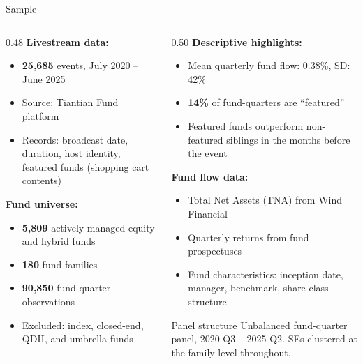 \documentclass[11pt, aspectratio=169]{beamer}
\newcommand{\hl}[1]{\textcolor{myblue}{\textbf{#1}}}
\begin{document}
\begin{frame}{Sample}

\begin{columns}[T]
\begin{column}{0.48\textwidth}
\textbf{Livestream data:}
\begin{itemize}
  \item \hl{25,685} events, July 2020 -- June 2025
  \item Source: Tiantian Fund platform
  \item Records: broadcast date, duration, host identity,
  featured funds (shopping cart contents)
\end{itemize}

\vspace{0.25cm}
\textbf{Fund universe:}
\begin{itemize}
  \item \hl{5,809} actively managed equity and hybrid funds
  \item \hl{180} fund families
  \item \hl{90,850} fund-quarter observations
  \item Excluded: index, closed-end, QDII, and umbrella funds
\end{itemize}
\end{column}
\begin{column}{0.50\textwidth}
\textbf{Descriptive highlights:}
\begin{itemize}
  \item Mean quarterly fund flow: 0.38\%, SD: 42\%
  \item \hl{14\%} of fund-quarters are ``featured''
  \item Featured funds outperform non-featured siblings
  in the months before the event
\end{itemize}

\vspace{0.25cm}
\textbf{Fund flow data:}
\begin{itemize}
  \item Total Net Assets (TNA) from Wind Financial
  \item Quarterly returns from fund prospectuses
  \item Fund characteristics: inception date, manager,
  benchmark, share class structure
\end{itemize}

\vspace{0.2cm}
\begin{block}{Panel structure}
  Unbalanced fund-quarter panel, 2020 Q3 -- 2025 Q2.
  SEs clustered at the family level throughout.
\end{block}
\end{column}
\end{columns}

\end{frame}
\end{document}
